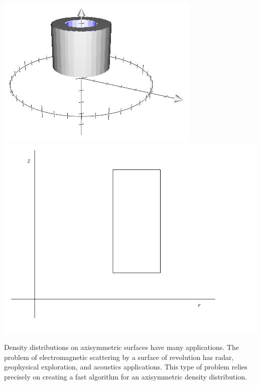 \documentclass[11pt, oneside]{article}   	%
\begin{document}
\includegraphics[scale=0.5]{pipe2}
\includegraphics[scale=0.35]{rect}

Density distributions on axisymmetric surfaces have many applications. The problem of electromagnetic scattering by a surface of revolution has radar, geophysical exploration, and acoustics applications. This type of problem relies precisely on creating a fast algorithm for an axisymmetric density distribution.
\end{document}
